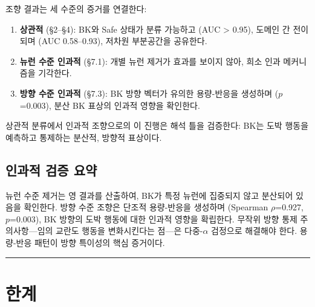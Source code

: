 \documentclass[11pt,a4paper]{article}
\begin{document}
조향 결과는 세 수준의 증거를 연결한다:

\begin{enumerate}[nosep]
    \item \textbf{상관적} (\S2--\S4): BK와 Safe 상태가 분류 가능하고 (AUC > 0.95), 도메인 간 전이되며 (AUC 0.58--0.93), 저차원 부분공간을 공유한다.
    \item \textbf{뉴런 수준 인과적} (\S7.1): 개별 뉴런 제거가 효과를 보이지 않아, 희소 인과 메커니즘을 기각한다.
    \item \textbf{방향 수준 인과적} (\S7.3): BK 방향 벡터가 유의한 용량-반응을 생성하며 ($p$=0.003), 분산 BK 표상의 인과적 영향을 확인한다.
\end{enumerate}

상관적 분류에서 인과적 조향으로의 이 진행은 해석 틀을 검증한다: BK는 도박 행동을 예측하고 통제하는 분산적, 방향적 표상이다.

\subsection{인과적 검증 요약}

뉴런 수준 제거는 영 결과를 산출하여, BK가 특정 뉴런에 집중되지 않고 분산되어 있음을 확인한다. 방향 수준 조향은 단조적 용량-반응을 생성하며 (Spearman $\rho$=0.927, $p$=0.003), BK 방향의 도박 행동에 대한 인과적 영향을 확립한다. 무작위 방향 통제 주의사항---임의 교란도 행동을 변화시킨다는 점---은 다중-$\alpha$ 검정으로 해결해야 한다. 용량-반응 패턴이 방향 특이성의 핵심 증거이다.

\bigskip\hrule\bigskip

\section{한계}
\end{document}
